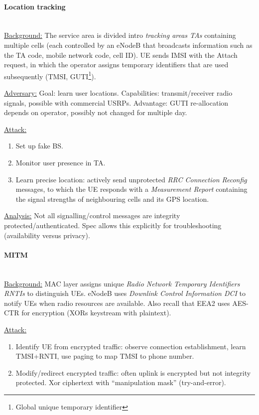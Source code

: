\paragraph{Location tracking} \mbox{} \\
\underline{Background:}
The service area is divided intro \textit{tracking areas TAs} containing multiple cells (each controlled by an eNodeB that broadcasts information such as the TA code, mobile network code, cell ID).
UE sends IMSI with the Attach request, in which the operator assigns temporary identifiers that are used subsequently (TMSI, GUTI\footnote{Global unique temporary identifier}).

\underline{Adversary:}
Goal: learn user locations.
Capabilities: transmit/receiver radio signals, possible with commercial USRPs.
Advantage: GUTI re-allocation depends on operator, possibly not changed for multiple day.

\underline{Attack:}
\begin{enumerate}
	\item Set up fake BS.
	\item Monitor user presence in TA.
	\item Learn precise location:
	actively send unprotected \textit{RRC Connection Reconfig} messages, to which the UE responds with a \textit{Measurement Report} containing the signal strengths of neighbouring cells and its GPS location.
\end{enumerate}

\underline{Analysis:}
Not all signalling/control messages are integrity protected/authenticated.
Spec allows this explicitly for troubleshooting (availability versus privacy).

\paragraph{MITM} \mbox{} \\
\underline{Background:}
MAC layer assigns unique \textit{Radio Network Temporary Identifiers RNTIs} to distinguish UEs.
eNodeB uses \textit{Downlink Control Information DCI} to notify UEs when radio resources are available.
Also recall that EEA2 uses AES-CTR for encryption (XORs keystream with plaintext).

\underline{Attack:}
\begin{enumerate}
	\item Identify UE from encrypted traffic: observe connection establishment, learn TMSI+RNTI, use paging to map TMSI to phone number.
	\item Modify/redirect encrypted traffic: often uplink is encrypted but not integrity protected. Xor ciphertext with ``manipulation mask'' (try-and-error).
\end{enumerate}

